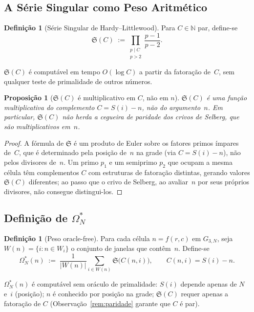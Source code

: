\documentclass[12pt,a4paper]{article}
\newtheorem{proposition}[theorem]{Proposição}
\theoremstyle{definition}
\newtheorem{definition}[theorem]{Definição}
\theoremstyle{remark}
\newcommand{\NN}{\mathbb{N}}
\newcommand{\Grid}{G_{3,N}}
\newcommand{\Oms}{\Omega^*_N}        %
\newcommand{\Ss}{\mathfrak{S}}       %
\begin{document}
	\subsection{A Série Singular como Peso Aritmético}
	
	\begin{definition}[Série Singular de Hardy--Littlewood]
		Para $C\in\NN$ par, define-se
		\[
		\Ss(C) \;:=\!\!\prod_{\substack{p\mid C\\p>2}}\!\frac{p-1}{p-2}.
		\]
	\end{definition}
	
	$\Ss(C)$ é computável em tempo $O(\log C)$ a partir da fatoração de~$C$,
	sem qualquer teste de primalidade de outros números.
	
	\begin{proposition}[$\Ss(C)$ é multiplicativo em $C$, não em $n$]
		\label{prop:mult}
		$\Ss(C)$ é uma função multiplicativa do complemento $C=S(i)-n$, não do
		argumento~$n$. Em particular, $\Ss(C)$ \emph{não} herda a cegueira de
		paridade dos crivos de Selberg, que são multiplicativos em~$n$.
	\end{proposition}
	
	\begin{proof}
		A fórmula de $\Ss$ é um produto de Euler sobre os fatores primos ímpares
		de~$C$, que é determinado pela posição de~$n$ na grade (via $C=S(i)-n$),
		não pelos divisores de~$n$.
		Um primo $p_1$ e um semiprimo $p_2$ que ocupam a mesma célula têm
		complementos $C$ com estruturas de fatoração distintas, gerando valores
		$\Ss(C)$ diferentes; ao passo que o crivo de Selberg, ao avaliar~$n$ por
		seus próprios divisores, não consegue distingui-los.
	\end{proof}
	
	\subsection{Definição de $\Oms$}
	
	\begin{definition}[Peso oracle-free]
		\label{def:omegastar}
		Para cada célula $n=f(r,c)$ em $\Grid$, seja
		$W(n)=\{i: n\in W_i\}$ o conjunto de janelas que contêm~$n$.
		Define-se
		\[
		\Oms(n) \;:=\; \frac{1}{|W(n)|}\sum_{i\in W(n)}\Ss\!\bigl(C(n,i)\bigr),
		\qquad C(n,i)=S(i)-n.
		\]
	\end{definition}
	
	$\Oms(n)$ é computável sem oráculo de primalidade:
	$S(i)$ depende apenas de $N$ e~$i$ (posição);
	$n$ é conhecido por posição na grade;
	$\Ss(C)$ requer apenas a fatoração de $C$ (Observação~\ref{rem:paridade}
	garante que $C$ é par).
	
\end{document}
